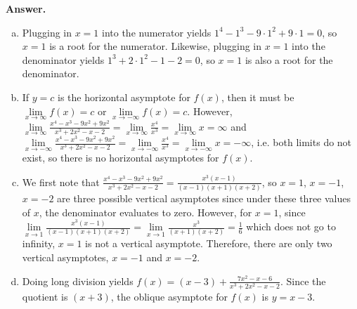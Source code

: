 \documentclass[11pt,letterpaper]{article}
\newcommand{\answer}{\noindent \textbf{Answer. }}
\begin{document}
\answer
\begin{enumerate}[(a)]
    \item Plugging in $x=1$ into the numerator yields $1^4-1^3-9 \cdot 1^2+9 \cdot 1 = 0$, so $x=1$ is a root for the numerator.  Likewise, plugging in $x=1$ into the denominator yields $1^3+ 2 \cdot 1^2 - 1 - 2 = 0$, so $x=1$ is also a root for the denominator.
    \item If $y=c$ is the horizontal asymptote for $f(x)$, then it must be $\lim\limits_{x \to \infty} f(x) = c$ or $\lim\limits_{x \to -\infty} f(x) = c$.  However, $\lim\limits_{x \to \infty} \frac{x^4-x^3-9x^2+9x^2}{x^3+2x^2-x-2} = \lim\limits_{x \to \infty} \frac{x^4}{x^3} = \lim\limits_{x \to \infty} x = \infty$ and $\lim\limits_{x \to -\infty} \frac{x^4-x^3-9x^2+9x^2}{x^3+2x^2-x-2} = \lim\limits_{x \to -\infty} \frac{x^4}{x^3} = \lim\limits_{x \to -\infty} x = -\infty$, i.e. both limits do not exist, so there is no horizontal asymptotes for $f(x)$.
    \item We first note that $\frac{x^4-x^3-9x^2+9x^2}{x^3+2x^2-x-2} = \frac{x^3(x-1)}{(x-1)(x+1)(x+2)}$, so $x=1$, $x=-1$, $x=-2$ are three possible vertical asymptotes since under these three values of $x$, the denominator evaluates to zero.  However, for $x=1$, since $\lim\limits_{x \to 1}\frac{x^3(x-1)}{(x-1)(x+1)(x+2)} = \lim\limits_{x \to 1}\frac{x^3}{(x+1)(x+2)} = \frac{1}{6}$ which does not go to infinity, $x=1$ is not a vertical asymptote.  Therefore, there are only two vertical asymptotes, $x=-1$ and $x=-2$.
    \item Doing long division yields $f(x) = (x-3) + \frac{7x^2-x-6}{x^3+2x^2-x-2}$.  Since the quotient is $(x+3)$, the oblique asymptote for $f(x)$ is $y = x-3$.
\end{enumerate}
\end{document}
